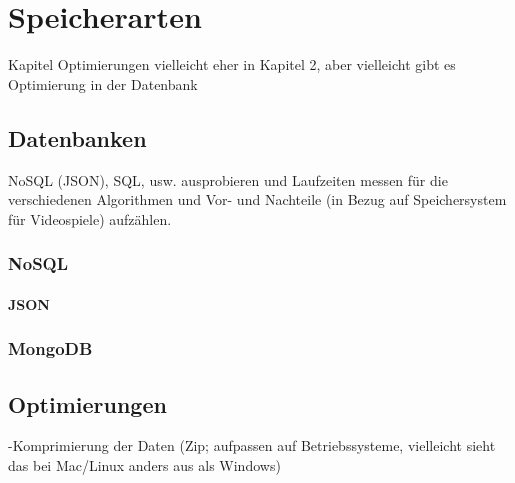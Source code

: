 \chapter{Speicherarten}\label{ch:speicherarten}

Kapitel Optimierungen vielleicht eher in Kapitel 2, aber vielleicht gibt es 
Optimierung in der Datenbank

\section{Datenbanken}
NoSQL (JSON), SQL, usw. ausprobieren und Laufzeiten messen für die verschiedenen Algorithmen 
und Vor- und Nachteile (in Bezug auf Speichersystem für Videospiele) aufzählen. 

\subsection{NoSQL}
\subsubsection{JSON}

\subsection{MongoDB}

\section{Optimierungen}
-Komprimierung der Daten (Zip; aufpassen auf Betriebssysteme, vielleicht sieht das bei Mac/Linux anders aus als Windows)

